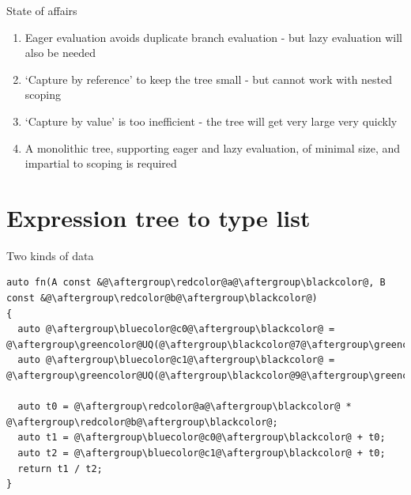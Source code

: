\documentclass[xcolor=dvipsnames]{beamer}
\begin{document}
\begin{frame}[fragile]{State of affairs}
  \begin{enumerate}
  \item Eager evaluation avoids duplicate branch evaluation - but lazy evaluation will also be needed \vspace{5mm}
  \item `Capture by reference' to keep the tree small - but cannot work with nested scoping \vspace{5mm}
  \item `Capture by value' is too inefficient - the tree will get very large very quickly \vspace{5mm}
  \item A monolithic tree, supporting eager and lazy evaluation, of minimal size, and impartial to scoping is required \vspace{5mm}
  \end{enumerate}
\end{frame}


\section{Expression tree to type list}

\begin{frame}[fragile]{Two kinds of data}
\begin{lstlisting}
auto fn(A const &@\aftergroup\redcolor@a@\aftergroup\blackcolor@, B const &@\aftergroup\redcolor@b@\aftergroup\blackcolor@)
{
  auto @\aftergroup\bluecolor@c0@\aftergroup\blackcolor@ = @\aftergroup\greencolor@UQ(@\aftergroup\blackcolor@7@\aftergroup\greencolor@)@\aftergroup\blackcolor@;
  auto @\aftergroup\bluecolor@c1@\aftergroup\blackcolor@ = @\aftergroup\greencolor@UQ(@\aftergroup\blackcolor@9@\aftergroup\greencolor@)@\aftergroup\blackcolor@;

  auto t0 = @\aftergroup\redcolor@a@\aftergroup\blackcolor@ * @\aftergroup\redcolor@b@\aftergroup\blackcolor@;
  auto t1 = @\aftergroup\bluecolor@c0@\aftergroup\blackcolor@ + t0;
  auto t2 = @\aftergroup\bluecolor@c1@\aftergroup\blackcolor@ + t0;
  return t1 / t2;
}
\end{lstlisting}
\end{frame}
\end{document}
